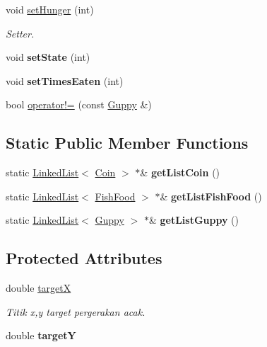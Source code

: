 \begin{DoxyCompactItemize}
\mbox{\label{class_guppy_a6b2765ab767641e81d6d0893760701db}} 
void \mbox{\hyperlink{class_guppy_a6b2765ab767641e81d6d0893760701db}{set\+Hunger}} (int)
\begin{DoxyCompactList}\small\item\em Setter. \end{DoxyCompactList}\item 
\mbox{\label{class_guppy_a29ed4965a438e20b13fef37e0fd463e3}} 
void {\bfseries set\+State} (int)
\item 
\mbox{\label{class_guppy_ada1ee6f4fc184fe4c3222c49426b1a7f}} 
void {\bfseries set\+Times\+Eaten} (int)
\item 
bool \mbox{\hyperlink{class_guppy_af967c03410302b43a594b3bdf8892e87}{operator!=}} (const \mbox{\hyperlink{class_guppy}{Guppy}} \&)
\end{DoxyCompactItemize}
\subsection*{Static Public Member Functions}
\begin{DoxyCompactItemize}
\item 
\mbox{\label{class_guppy_aa82af5932894c1dfbd9ba2d5d3bd12ed}} 
static \mbox{\hyperlink{class_linked_list}{Linked\+List}}$<$ \mbox{\hyperlink{class_coin}{Coin}} $>$ $\ast$\& {\bfseries get\+List\+Coin} ()
\item 
\mbox{\label{class_guppy_aed33a58f608b86580702f024c7689efd}} 
static \mbox{\hyperlink{class_linked_list}{Linked\+List}}$<$ \mbox{\hyperlink{class_fish_food}{Fish\+Food}} $>$ $\ast$\& {\bfseries get\+List\+Fish\+Food} ()
\item 
\mbox{\label{class_guppy_a891edcbbec8fba1e45ea259d7c6870fa}} 
static \mbox{\hyperlink{class_linked_list}{Linked\+List}}$<$ \mbox{\hyperlink{class_guppy}{Guppy}} $>$ $\ast$\& {\bfseries get\+List\+Guppy} ()
\end{DoxyCompactItemize}
\subsection*{Protected Attributes}
\begin{DoxyCompactItemize}
\item 
\mbox{\label{class_guppy_ab7a903947b530f8e3125189d3c42b69b}} 
double \mbox{\hyperlink{class_guppy_ab7a903947b530f8e3125189d3c42b69b}{targetX}}
\begin{DoxyCompactList}\small\item\em Titik x,y target pergerakan acak. \end{DoxyCompactList}\item 
\mbox{\label{class_guppy_a4ffb03e3c2f9d3c425c3509abbd0d859}} 
double {\bfseries targetY}
\end{DoxyCompactItemize}



